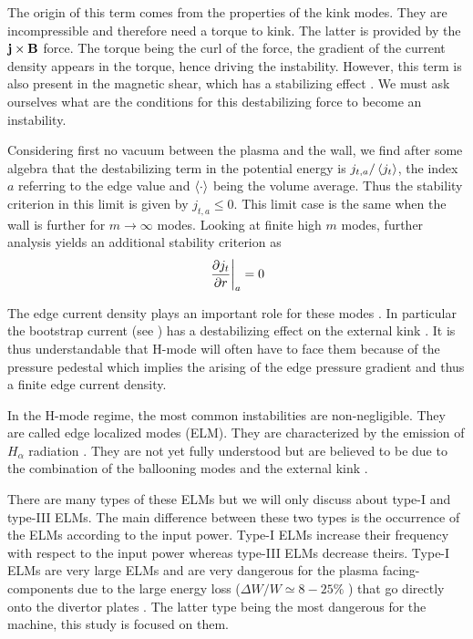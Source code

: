 The origin of this term comes from the properties of the kink modes. They are incompressible and therefore need a torque to kink. The latter is provided by the $\mathbf{j} \times \mathbf{B}$ force. The torque being the curl of the force, the gradient of the current density appears in the torque, hence driving the instability. However, this term is also present in the magnetic shear, which has a stabilizing effect \cite{wesson1978}. We must ask ourselves what are the conditions for this destabilizing force to become an instability.

Considering first no vacuum between the plasma and the wall, we find after some algebra that the destabilizing term in the potential energy is $j_{t,a} / \left\langle j_t \right\rangle$, the index $a$ referring to the edge value and $\left\langle \cdot \right\rangle$ being the volume average. Thus the stability criterion in this limit is given by $j_{t,a} \le 0$. This limit case is the same when the wall is further for $m \rightarrow \infty$ modes. Looking at finite high $m$ modes, further analysis yields an additional stability criterion as
\begin{align*}
	\left. \dfrac{\partial j_t}{\partial r} \right|_a = 0
\end{align*}

The edge current density plays an important role for these modes \cite{connor1998}. In particular the bootstrap current (see ) has a destabilizing effect on the external kink \cite{gimblett2006}. It is thus understandable that H-mode will often have to face them because of the pressure pedestal which implies the arising of the edge pressure gradient and thus a finite edge current density.

In the H-mode regime, the most common instabilities are non-negligible. They are called edge localized modes (ELM). They are characterized by the emission of $H_{\alpha}$ radiation \cite{wesson}. They are not yet fully understood but are believed to be due to the combination of the ballooning modes and the external kink \cite{loennroth2004}.

There are many types of these ELMs but we will only discuss about type-I and type-III ELMs. The main difference between these two types is the occurrence of the ELMs according to the input power. Type-I ELMs increase their frequency with respect to the input power whereas type-III ELMs decrease theirs. Type-I ELMs are very large ELMs and are very dangerous for the plasma facing-components due to the large energy loss ($\Delta W / W \simeq 8 - 25 \%$ \cite{andreas2010}) that go directly onto the divertor plates \cite{wesson}. The latter type being the most dangerous for the machine, this study is focused on them.

